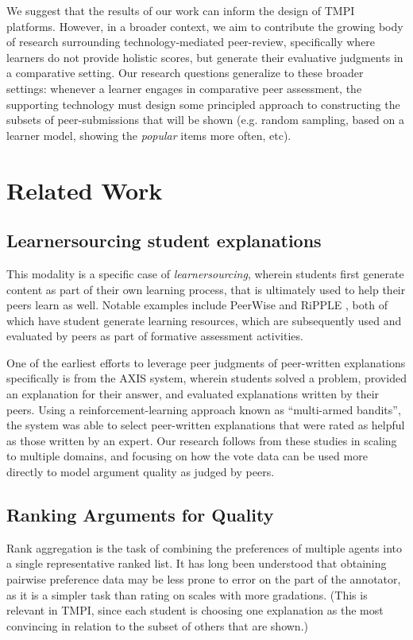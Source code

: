 \documentclass[sigconf]{acmart}
\begin{document}
We suggest that the results of our work can inform the design of TMPI platforms.
However, in a broader context, we aim to contribute the growing body of 
research surrounding technology-mediated peer-review, specifically where 
learners do not provide holistic scores, but generate their evaluative 
judgments in a comparative setting.
Our research questions generalize to these broader settings: whenever a learner 
engages in comparative peer assessment, the supporting technology must design 
some principled approach to constructing the subsets of peer-submissions that 
will be shown (e.g. random sampling, based on a learner model, showing the 
\textit{popular} items more often, etc).


\section{Related Work}

\subsection{Learnersourcing student explanations}
This modality is a specific case of  
\textit{learnersourcing}\cite{weir_learnersourcing_2015}, wherein students first
generate content as part of their own learning process, that is ultimately used 
to help their peers learn as well.
Notable examples include PeerWise \cite{denny_peerwise:_2008} and RiPPLE 
\cite{khosravi_ripple_2019}, both of which have student generate learning 
resources, which are subsequently used and evaluated by peers as part of 
formative assessment activities.

One of the earliest efforts to leverage peer judgments of peer-written 
explanations specifically is from the AXIS system\cite{williams_axis:_2016}, 
wherein students solved a problem, provided an explanation for their answer, 
and evaluated explanations written by their peers.
Using a reinforcement-learning approach known as ``multi-armed bandits'', the 
system was able to select peer-written explanations that were rated as helpful 
as those written by an expert.
Our research follows from these studies in scaling to multiple domains, and 
focusing on how the vote data can be used more directly to model argument 
quality as judged by peers.

\subsection{Ranking Arguments for Quality}
Rank aggregation is the task of combining the preferences of multiple agents 
into a single representative ranked list.
It has long been understood that obtaining pairwise preference data may be 
less prone to error on the part of the annotator, as it is a simpler task than 
rating on scales with more gradations. 
(This is relevant in TMPI, since each student is choosing one explanation as 
the most convincing in relation to the subset of others that are shown.)
 
\end{document}
